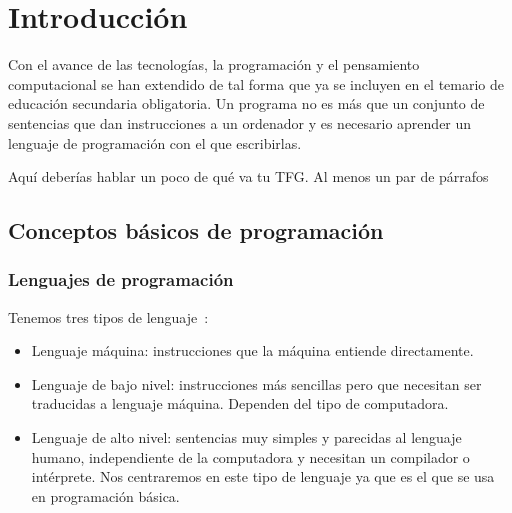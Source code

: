 \documentclass[a4paper, 12pt]{book}
\begin{document}
\tableofcontents 
\cleardoublepage
\listoffigures %



\cleardoublepage
\chapter{Introducción}
\label{sec:intro} %
Con el avance de las tecnologías, la programación y el pensamiento computacional se han extendido de tal forma que ya se incluyen en el temario de educación secundaria obligatoria. Un programa no es más que un conjunto de sentencias que dan instrucciones a un ordenador y es necesario aprender un lenguaje de programación con el que escribirlas.

{\color{red} Aquí deberías hablar un poco de qué va tu TFG. Al menos un par de párrafos}

\section{Conceptos básicos de programación}
\label{sec:conceptos basicos}

\subsection{Lenguajes de programación}
\label{subsec:estilo}
Tenemos tres tipos de lenguaje~\cite{aguilar1988fundamentos}:
\begin{itemize}
    \item Lenguaje máquina: instrucciones que la máquina entiende directamente.
    \item Lenguaje de bajo nivel: instrucciones más sencillas pero que necesitan ser traducidas a lenguaje máquina. Dependen del tipo de computadora.
    \item Lenguaje de alto nivel: sentencias muy simples y parecidas al lenguaje humano, independiente de la computadora y necesitan un compilador o intérprete. Nos centraremos en este tipo de lenguaje ya que es el que se usa en programación básica.
    
\end{itemize} 
\end{document}
